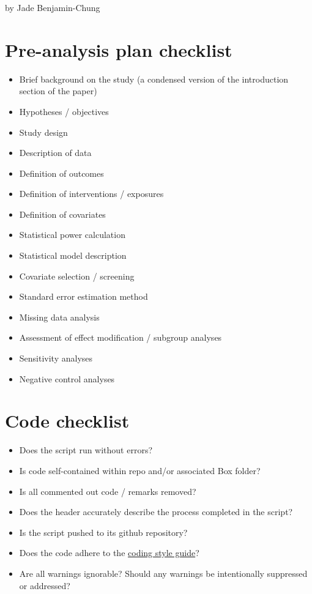 \documentclass[
]{book}
\providecommand{\tightlist}{%
  \setlength{\itemsep}{0pt}\setlength{\parskip}{0pt}}
\begin{document}
by Jade Benjamin-Chung

\section{Pre-analysis plan checklist}\label{pre-analysis-plan-checklist}

\begin{itemize}
\tightlist
\item
  Brief background on the study (a condensed version of the introduction section of the paper)
\item
  Hypotheses / objectives
\item
  Study design
\item
  Description of data
\item
  Definition of outcomes
\item
  Definition of interventions / exposures
\item
  Definition of covariates
\item
  Statistical power calculation
\item
  Statistical model description
\item
  Covariate selection / screening
\item
  Standard error estimation method
\item
  Missing data analysis
\item
  Assessment of effect modification / subgroup analyses
\item
  Sensitivity analyses
\item
  Negative control analyses
\end{itemize}

\section{Code checklist}\label{code-checklist}

\begin{itemize}
\tightlist
\item
  Does the script run without errors?
\item
  Is code self-contained within repo and/or associated Box folder?
\item
  Is all commented out code / remarks removed?
\item
  Does the header accurately describe the process completed in the script?
\item
  Is the script pushed to its github repository?
\item
  Does the code adhere to the \href{https://jadebc.github.io/lab-manual/coding-style.html}{coding style guide}?
\item
  Are all warnings ignorable? Should any warnings be intentionally suppressed or addressed?
\end{itemize}
\end{document}
